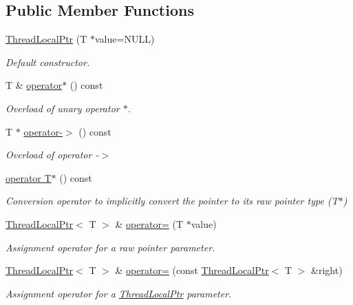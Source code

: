 \subsection*{Public Member Functions}
\begin{DoxyCompactItemize}
\item 
\hyperlink{classsf_1_1_thread_local_ptr_a8c678211d7828d2a8c41cb534422d649}{Thread\+Local\+Ptr} (T $\ast$value=N\+U\+LL)
\begin{DoxyCompactList}\small\item\em Default constructor. \end{DoxyCompactList}\item 
T \& \hyperlink{classsf_1_1_thread_local_ptr_adcbb45ae077df714bf9c61e936d97770}{operator$\ast$} () const
\begin{DoxyCompactList}\small\item\em Overload of unary operator $\ast$. \end{DoxyCompactList}\item 
T $\ast$ \hyperlink{classsf_1_1_thread_local_ptr_a25646e1014a933d1a45b9ce17bab7703}{operator-\/$>$} () const
\begin{DoxyCompactList}\small\item\em Overload of operator -\/$>$ \end{DoxyCompactList}\item 
\hyperlink{classsf_1_1_thread_local_ptr_a81ca089ae5cda72c7470ca93041c3cb2}{operator T$\ast$} () const
\begin{DoxyCompactList}\small\item\em Conversion operator to implicitly convert the pointer to its raw pointer type (T$\ast$) \end{DoxyCompactList}\item 
\hyperlink{classsf_1_1_thread_local_ptr}{Thread\+Local\+Ptr}$<$ T $>$ \& \hyperlink{classsf_1_1_thread_local_ptr_a14dcf1cdf5f6b3bcdd633014b2b671f5}{operator=} (T $\ast$value)
\begin{DoxyCompactList}\small\item\em Assignment operator for a raw pointer parameter. \end{DoxyCompactList}\item 
\hyperlink{classsf_1_1_thread_local_ptr}{Thread\+Local\+Ptr}$<$ T $>$ \& \hyperlink{classsf_1_1_thread_local_ptr_a6792a6a808af06f0d13e3ceecf2fc947}{operator=} (const \hyperlink{classsf_1_1_thread_local_ptr}{Thread\+Local\+Ptr}$<$ T $>$ \&right)
\begin{DoxyCompactList}\small\item\em Assignment operator for a \hyperlink{classsf_1_1_thread_local_ptr}{Thread\+Local\+Ptr} parameter. \end{DoxyCompactList}\end{DoxyCompactItemize}


